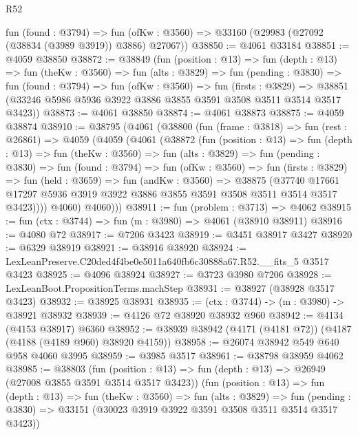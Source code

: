 \begin{lexlean}{R52}
\begin{coremodule}
    fun (found : @3794) =>
    fun (ofKw : @3560) => @33160 (@29983 (@27092 (@38834 (@3989 @3919)) @3886) @27067))
@38850 := @4061 @33184
@38851 := @4059 @38850
@38872 := @38849
    (fun (position : @13) =>
    fun (depth : @13) =>
    fun (theKw : @3560) =>
    fun (alts : @3829) =>
    fun (pending : @3830) =>
    fun (found : @3794) =>
    fun (ofKw : @3560) =>
    fun (firsts : @3829) =>
    @38851 (@33246 @5986 @5936 @3922 @3886 @3855 @3591 @3508 @3511 @3514 @3517 @3423))
@38873 := @4061 @38850
@38874 := @4061 @38873
@38875 := @4059 @38874
@38910 := @38795
    (@4061
      (@38800
        (fun (frame : @3818) =>
        fun (rest : @26861) =>
        @4059
          (@4059
            (@4061
              (@38872
                (fun (position : @13) =>
                fun (depth : @13) =>
                fun (theKw : @3560) =>
                fun (alts : @3829) =>
                fun (pending : @3830) =>
                fun (found : @3794) =>
                fun (ofKw : @3560) =>
                fun (firsts : @3829) =>
                fun (held : @3659) =>
                fun (andKw : @3560) =>
                @38875
                  (@37740
                    @17661
                    @17297
                    @5936
                    @3919
                    @3922
                    @3886
                    @3855
                    @3591
                    @3508
                    @3511
                    @3514
                    @3517
                    @3423))))
            @4060)
          @4060)))
@38911 := fun (problem : @3713) => @4062
@38915 := fun (ctx : @3744) => fun (m : @3980) => @4061 (@38910 @38911)
@38916 := @4080 @72
@38917 := @7206 @3423
@38919 := @3451 @38917 @3427
@38920 := @6329 @38919
@38921 := @38916 @38920
@38924 := LexLeanPreserve.C20ded4f4be0e5011a640fb6c30888a67.R52.__fits_5 @3517 @3423
@38925 := @4096 @38924
@38927 := @3723 @3980 @7206
@38928 := LexLeanBoot.PropositionTerms.machStep
@38931 := @38927 (@38928 @3517 @3423)
@38932 := @38925 @38931
@38935 := (ctx : @3744) -> (m : @3980) -> @38921 @38932
@38939 := @4126 @72 @38920 @38932 @960
@38942 := @4134 (@4153 @38917) @6360
@38952 := @38939 @38942 (@4171 (@4181 @72)) (@4187 (@4188 (@4189 @960) @38920 @4159))
@38958 := @26074 @38942 @549 @640 @958 @4060 @3995
@38959 := @3985 @3517
@38961 := @38798 @38959 @4062
@38985 := @38803
    (fun (position : @13) => fun (depth : @13) => @26949 (@27008 @3855 @3591 @3514 @3517 @3423))
    (fun (position : @13) =>
    fun (depth : @13) =>
    fun (theKw : @3560) =>
    fun (alts : @3829) =>
    fun (pending : @3830) => @33151 (@30023 @3919 @3922 @3591 @3508 @3511 @3514 @3517 @3423))

\end{coremodule}
\end{lexlean}
